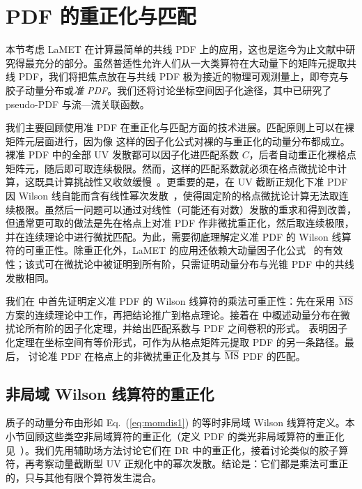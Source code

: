 \section{PDF 的重正化与匹配}
\label{sec:renorm}
本节考虑 LaMET 在计算最简单的共线 PDF 上的应用，这也是迄今为止文献中研究得最充分的部分。虽然普适性允许人们从一大类算符在大动量下的矩阵元提取共线 PDF，我们将把焦点放在与共线 PDF 极为接近的物理可观测量上，即夸克与胶子动量分布或{\it 准 PDF}。我们还将讨论坐标空间因子化途径，其中已研究了 pseudo-PDF 与流—流关联函数。

我们主要回顾使用准 PDF 在重正化与匹配方面的技术进展。匹配原则上可以在裸矩阵元层面进行，因为像  这样的因子化公式对裸的与重正化的动量分布都成立。裸准 PDF 中的全部 UV 发散都可以因子化进匹配系数 $C$，后者自动重正化裸格点矩阵元，随后即可取连续极限。然而，这样的匹配系数就必须在格点微扰论中计算，这既具计算挑战性又收敛缓慢~\cite{Lepage:1992xa}。更重要的是，在 UV 截断正规化下准 PDF 因 Wilson 线自能而含有线性幂次发散~\cite{Ji:2013dva,Xiong:2013bka}，使得固定阶的格点微扰论计算无法取连续极限。虽然后一问题可以通过对线性（可能还有对数）发散的重求和得到改善，但通常更可取的做法是先在格点上对准 PDF 作非微扰重正化，然后取连续极限，并在连续理论中进行微扰匹配。为此，需要彻底理解定义准 PDF 的 Wilson 线算符的可重正性。除重正化外，LaMET 的应用还依赖大动量因子化公式~ 的有效性；该式可在微扰论中被证明到所有阶，只需证明动量分布与光锥 PDF 中的共线发散相同。

我们在  中首先证明定义准 PDF 的 Wilson 线算符的乘法可重正性：先在采用 ${\overline{\rm MS}}$ 方案的连续理论中工作，再把结论推广到格点理论。接着在  中概述动量分布在微扰论所有阶的因子化定理，并给出匹配系数与 PDF 之间卷积的形式。 表明因子化定理在坐标空间有等价形式，可作为从格点矩阵元提取 PDF 的另一条路径。最后， 讨论准 PDF 在格点上的非微扰重正化及其与 ${\overline{\rm MS}}$ PDF 的匹配。

\subsection{非局域 Wilson 线算符的重正化}
\label{sec:renorm-nl}
质子的动量分布由形如 Eq.~(\ref{eq:momdis1}) 的等时非局域 Wilson 线算符定义。本小节回顾这些类空非局域算符的重正化（定义 PDF 的类光非局域算符的重正化见~\cite{Collins:1981uw,Collins:2011zzd}）。我们先用辅助场方法讨论它们在 DR 中的重正化，接着讨论类似的胶子算符，再考察动量截断型 UV 正规化中的幂次发散。结论是：它们都是乘法可重正的，只与其他有限个算符发生混合。

